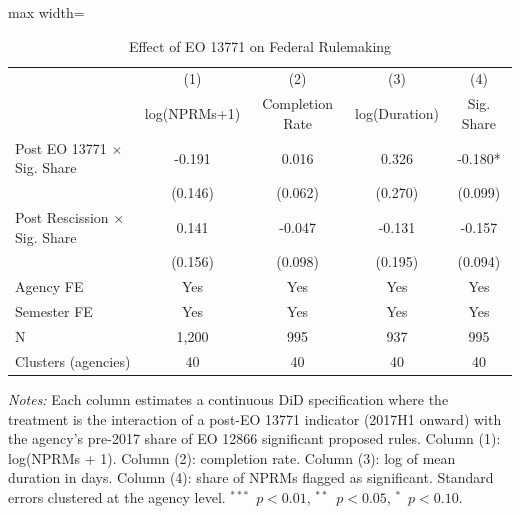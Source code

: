 \begin{table}[htbp]
\centering
\caption{Effect of EO 13771 on Federal Rulemaking}
\label{tab:main}
\begin{adjustbox}{max width=\textwidth}
\begin{tabular}{lcccc}
\toprule
 & (1) & (2) & (3) & (4) \\
 & log(NPRMs+1) & Completion Rate & log(Duration) & Sig. Share \\
\midrule
Post EO 13771 $\times$ Sig. Share & -0.191 & 0.016 & 0.326 & -0.180* \\
 & (0.146) & (0.062) & (0.270) & (0.099) \\
Post Rescission $\times$ Sig. Share & 0.141 & -0.047 & -0.131 & -0.157 \\
 & (0.156) & (0.098) & (0.195) & (0.094) \\
\midrule
Agency FE & Yes & Yes & Yes & Yes \\
Semester FE & Yes & Yes & Yes & Yes \\
N & 1,200 & 995 & 937 & 995 \\
Clusters (agencies) & 40 & 40 & 40 & 40 \\
\bottomrule
\end{tabular}
\end{adjustbox}

\vspace{0.5em}
\parbox{\textwidth}{\footnotesize \textit{Notes:} Each column estimates a continuous DiD specification where the treatment is the interaction of a post-EO 13771 indicator (2017H1 onward) with the agency's pre-2017 share of EO 12866 significant proposed rules. Column (1): log(NPRMs + 1). Column (2): completion rate. Column (3): log of mean duration in days. Column (4): share of NPRMs flagged as significant. Standard errors clustered at the agency level. $^{***}$~$p<0.01$, $^{**}$~$p<0.05$, $^{*}$~$p<0.10$.}
\end{table}
